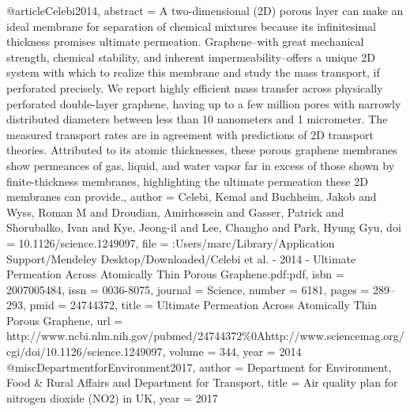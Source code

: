 @article{Celebi2014,
abstract = {A two-dimensional (2D) porous layer can make an ideal membrane for separation of chemical mixtures because its infinitesimal thickness promises ultimate permeation. Graphene--with great mechanical strength, chemical stability, and inherent impermeability--offers a unique 2D system with which to realize this membrane and study the mass transport, if perforated precisely. We report highly efficient mass transfer across physically perforated double-layer graphene, having up to a few million pores with narrowly distributed diameters between less than 10 nanometers and 1 micrometer. The measured transport rates are in agreement with predictions of 2D transport theories. Attributed to its atomic thicknesses, these porous graphene membranes show permeances of gas, liquid, and water vapor far in excess of those shown by finite-thickness membranes, highlighting the ultimate permeation these 2D membranes can provide.},
author = {Celebi, Kemal and Buchheim, Jakob and Wyss, Roman M and Droudian, Amirhossein and Gasser, Patrick and Shorubalko, Ivan and Kye, Jeong-il and Lee, Changho and Park, Hyung Gyu},
doi = {10.1126/science.1249097},
file = {:Users/marc/Library/Application Support/Mendeley Desktop/Downloaded/Celebi et al. - 2014 - Ultimate Permeation Across Atomically Thin Porous Graphene.pdf:pdf},
isbn = {2007005484},
issn = {0036-8075},
journal = {Science},
number = {6181},
pages = {289--293},
pmid = {24744372},
title = {{Ultimate Permeation Across Atomically Thin Porous Graphene}},
url = {http://www.ncbi.nlm.nih.gov/pubmed/24744372{\%}0Ahttp://www.sciencemag.org/cgi/doi/10.1126/science.1249097},
volume = {344},
year = {2014}
}
@misc{DepartmentforEnvironment2017,
author = {{Department for Environment}, Food {\&} Rural Affairs and {Department for Transport}},
title = {{Air quality plan for nitrogen dioxide (NO2) in UK}},
year = {2017}
}
